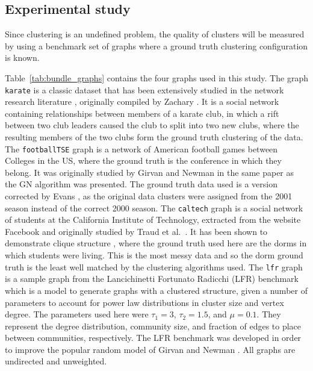 \subsection{Experimental study}
\label{sec:clustering_experiment}
Since clustering is an undefined problem, the quality of clusters will be measured by using a benchmark set of graphs where a ground truth clustering configuration is known.

Table~\ref{tab:bundle_graphs} contains the four graphs used in this study.
The graph \texttt{karate} is a classic dataset that has been extensively studied in the network research literature \cite{Fortunato2016}, originally compiled by Zachary \cite{Zachary1977}. It is a social network containing relationships between members of a karate club, in which a rift between two club leaders caused the club to split into two new clubs, where the resulting members of the two clubs form the ground truth clustering of the data.
The \texttt{footballTSE} graph is a network of American football games between Colleges in the US, where the ground truth is the conference in which they belong. It was originally studied by Girvan and Newman \cite{Girvan2002} in the same paper as the GN algorithm was presented. The ground truth data used is a version corrected by Evans \cite{Evans2010}, as the original data clusters were assigned from the 2001 season instead of the correct 2000 season. 
The \texttt{caltech} graph is a social network of students at the California Institute of Technology, extracted from the website Facebook and originally studied by Traud et al.\ \cite{Traud2012}. It has been shown to demonstrate clique structure \cite{Nocaj2015}, where the ground truth used here are the dorms in which students were living. This is the most messy data and so the dorm ground truth is the least well matched by the clustering algorithms used.
The \texttt{lfr} graph is a sample graph from the Lancichinetti Fortunato Radicchi (LFR) benchmark \cite{Lancichinetti2008} which is a model to generate graphs with a clustered structure, given a number of parameters to account for power law distributions in cluster size and vertex degree. The parameters used here were $\tau_1=3$, $\tau_2=1.5$, and $\mu=0.1$. They represent the degree distribution, community size, and fraction of edges to place between communities, respectively. The LFR benchmark was developed in order to improve the popular random model of Girvan and Newman \cite{Girvan2002}.
All graphs are undirected and unweighted.

